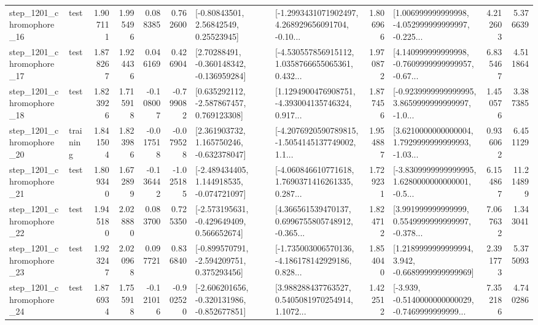 \begin{tabular}{llrrrrllrlrr}
 step\_1201\_chromophore\_16 &      test &      1.907111 &    1.995496 &      0.088385 &  0.762600 &       [-0.80843501, 2.56842549, 0.25523945] &  [-1.2993431071902497, 4.268929656091704, -0.10... &       1.806966 &  [1.006999999999998, -4.052999999999997, -0.225... &            4.212603 &          5.376639 \\
 step\_1201\_chromophore\_17 &      test &      1.878267 &    1.924436 &      0.046169 &  0.426904 &    [2.70288491, -0.360148342, -0.136959284] &  [-4.530557856915112, 1.0358766655065361, 0.432... &       1.970872 &  [4.140999999999998, -0.7609999999999957, -0.67... &            6.835467 &          4.511864 \\
 step\_1201\_chromophore\_18 &      test &      1.823926 &    1.715918 &     -0.108007 & -0.799082 &    [0.635292112, -2.587867457, 0.769123308] &  [1.1294900476908751, -4.393004135746324, 0.917... &       1.877456 &  [-0.9239999999999995, 3.8659999999999997, -1.0... &            1.450576 &          3.387385 \\
 step\_1201\_chromophore\_20 &  training &      1.841504 &    1.823986 &     -0.017518 & -0.079528 &    [2.361903732, 1.165750246, -0.632378047] &  [-4.2076920590789815, -1.5054145137749002, 1.1... &       1.954887 &  [3.6210000000000004, 1.7929999999999993, -1.03... &            0.936062 &          6.451129 \\
 step\_1201\_chromophore\_21 &      test &      1.809340 &    1.672899 &     -0.136442 & -1.025185 &   [-2.489434405, 1.144918535, -0.074721097] &  [-4.060846610771618, 1.7690371416261335, 0.287... &       1.729231 &  [-3.8309999999999995, 1.6280000000000001, -0.5... &            6.154867 &         11.214899 \\
 step\_1201\_chromophore\_22 &      test &      1.945180 &    2.028880 &      0.083700 &  0.725350 &   [-2.573195631, -0.429649409, 0.566652674] &  [4.366561539470137, 0.6996755805748912, -0.365... &       1.824712 &  [3.991999999999999, 0.5549999999999997, -0.378... &            7.067632 &          1.343041 \\
 step\_1201\_chromophore\_23 &      test &      1.923247 &    2.020968 &      0.097721 &  0.836840 &   [-0.899570791, -2.594209751, 0.375293456] &  [-1.735003006570136, -4.186178142929186, 0.828... &       1.854040 &   [1.2189999999999994, 3.942, -0.6689999999999969] &            2.391773 &          5.375093 \\
 step\_1201\_chromophore\_24 &      test &      1.876934 &    1.755918 &     -0.121016 & -0.902520 &  [-2.606201656, -0.320131986, -0.852677851] &  [3.988288437763527, 0.5405081970254914, 1.1072... &       1.422512 &  [-3.939, -0.5140000000000029, -0.7469999999999... &            7.352186 &          4.740286 \\

\end{tabular}
